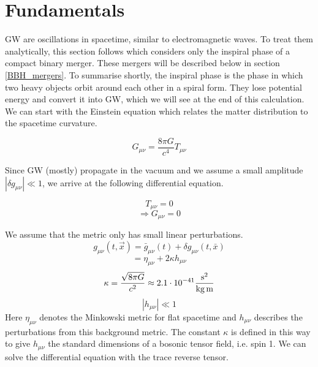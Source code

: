\section{Fundamentals}
\label{gw_fundamentals}
GW are oscillations in spacetime, similar to electromagnetic waves. To treat them analytically, this section follows \cite{van_holten_gravitational_2019} which considers only the inspiral phase of a compact binary merger. These mergers will be described below in section \ref{BBH_mergers}. To summarise shortly, the inspiral phase is the phase in which two heavy objects orbit around each other in a spiral form. They lose potential energy and convert it into GW, which we will see at the end of this calculation. 
We can start with the Einstein equation which relates the matter distribution to the spacetime curvature.

\begin{equation}
    G_{\mu\nu}= \frac{8\pi G}{c^4} T_{\mu\nu}
\end{equation}

Since GW (mostly) propagate in the vacuum and we assume a small amplitude $|\delta g_{\mu\nu}| \ll 1$, we arrive at the following differential equation.

\begin{equation}
    T_{\mu\nu} = 0
\end{equation}
\begin{equation}
    \Rightarrow G_{\mu\nu} = 0
\end{equation}


We assume that the metric only has small linear perturbations. 
\begin{equation}
    g_{\mu \nu}(t, \vec{x}) = \bar{g}_{\mu \nu}(t) + \delta g_{\mu \nu}(t, \bar{x})
\end{equation}
\begin{equation}
   = \eta_{\mu \nu} + 2\kappa h_{\mu \nu}
\end{equation}
\begin{equation}
    \kappa = \frac{\sqrt{8\pi G}}{c^2} \approx 2.1 \cdot 10^{-41}\frac{\rm{s}^2}{\rm{kg}\,\rm{ m}}
\end{equation}
\begin{equation}
    |h_{\mu \nu}| \ll 1
\end{equation}
Here $\eta_{ \mu \nu}$ denotes the Minkowski metric for flat spacetime and $h_{\mu\nu}$ describes the perturbations from this background metric. The constant $\kappa$ is defined in this way to give $h_{\mu\nu}$ the standard dimensions of a bosonic tensor field, i.e. spin 1.  We can solve the differential equation with the trace reverse tensor.

